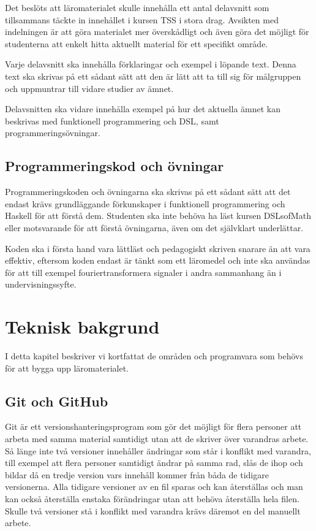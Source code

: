 \documentclass[12pt,a4paper,twoside,openright]{article}
\begin{document}
Det beslöts att läromaterialet skulle innehålla ett antal delavsnitt
som tillsammans täckte in innehållet i kursen TSS i stora drag.
Avsikten med indelningen är att göra materialet mer överskådligt och
även göra det möjligt för studenterna att enkelt hitta aktuellt
material för ett specifikt område.

Varje delavsnitt ska innehålla förklaringar och exempel i löpande text.
Denna text ska skrivas på ett sådant sätt att den är lätt att ta till
sig för målgruppen och uppmuntrar till vidare studier av ämnet.

Delavsnitten ska vidare innehålla exempel på hur det aktuella ämnet kan
beskrivas med funktionell programmering och DSL, samt programmeringsövningar.

\subsection{Programmeringskod och övningar}

Programmeringskoden och övningarna ska skrivas på ett sådant sätt att
det endast krävs grundläggande förkunskaper i funktionell
programmering och Haskell för att förstå dem. Studenten ska inte
behöva ha läst kursen DSLsofMath eller motsvarande för att förstå
övningarna, även om det självklart underlättar.

Koden ska i första hand vara lättläst och pedagogiskt skriven snarare
än att vara effektiv, eftersom koden endast är tänkt som ett läromedel
och inte ska användas för att till exempel fouriertransformera
signaler i andra sammanhang än i undervisningssyfte.

\section{Teknisk bakgrund}
I detta kapitel beskriver vi kortfattat de områden och programvara som
behövs för att bygga upp läromaterialet.

\subsection{Git och GitHub}
Git är ett versionshanteringsprogram som gör det möjligt för flera
personer att arbeta med samma material samtidigt utan att de skriver
över varandras arbete. Så länge inte två versioner innehåller
ändringar som står i konflikt med varandra, till exempel att flera
personer samtidigt ändrar på samma rad, slås de ihop och bildar då en tredje
version vars innehåll kommer från båda de tidigare versionerna. Alla
tidigare versioner av en fil sparas och kan återställas och man kan
också återställa enstaka förändringar utan att behöva återställa hela
filen. Skulle två versioner stå i konflikt med varandra krävs däremot
en del manuellt arbete.
\end{document}
